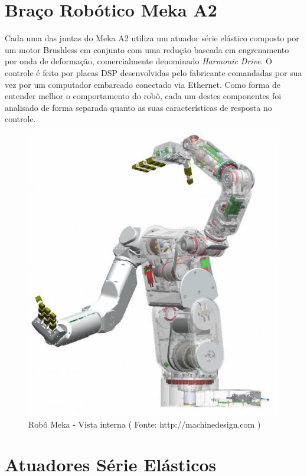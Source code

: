 
\section{Braço Robótico Meka A2}

Cada uma das juntas do Meka A2 utiliza um atuador série elástico composto por um motor Brushless em conjunto com uma redução baseada em engrenamento por onda de deformação, comercialmente denominado \textit{Harmonic Drive}. O controle é feito por placas DSP desenvolvidas pelo fabricante comandadas por sua vez por um computador embarcado conectado via Ethernet. Como forma de entender melhor o comportamento do robô, cada um destes componentes foi analisado de forma separada quanto as suas características de resposta no controle.

\begin{figure}[H]
    \centering
    \includegraphics[width = 0.6\linewidth]{tex/figs/meka-inside.png}
    \caption{Robô Meka - Vista interna ( Fonte:  http://machinedesign.com )}
    \label{fig:meka-inside}
\end{figure}

\section{Atuadores Série Elásticos}

